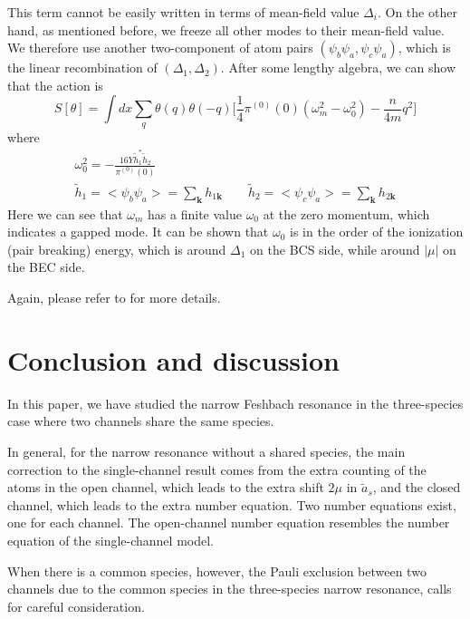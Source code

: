 \documentclass[reprint,pra]{revtex4-1}
\newcommand{\vk}{\ensuremath{\mathbf{k}}}
\newcommand{\nth}[1]{\ensuremath{\frac{1}{#1}}}
\providecommand{\abs}[1]{\ensuremath{\left\lvert{#1}\right\rvert}}
\newcommand{\av}[1]{\ensuremath{\bigl<{#1}\bigr>}}
\begin{document}
This term cannot be easily written in terms of mean-field value $\Delta_i$.   On the other hand, as mentioned before, we freeze all  other modes to their mean-field value.  We therefore use another two-component of atom pairs $({\psi_{b}\psi_{a}},{\psi_{c}\psi_{a}})$, which is the linear recombination of $(\Delta_{1},\Delta_{2})$.  
   After some lengthy algebra, we can show that the action is 
\begin{equation}\label{eq:pathInt2:outofphase}
S[\theta]=\int{dx}\sum_{q}\theta(q)\theta(-q)\big[\nth{4}\pi^{(0)}(0)(\omega_m^2-\omega_{0}^{2})-\frac{n}{4m}q^2\big]
\end{equation}
where
\begin{gather*}
\omega_{0}^{2}=-\frac{16Y\tilde{h}_{1}^{*}\tilde{h}_{2}}{\pi^{(0)}(0)}\\
 \tilde{h}_{1}=\av{\psi_{b}\psi_{a}}=\sum_{\vk}h_{1\vk}\qquad
\tilde{h}_{2}=\av{\psi_{c}\psi_{a}}=\sum_{\vk}h_{2\vk}
 \end{gather*}
Here we can see that  $\omega_{m}$ has a finite value $\omega_{0}$ at the zero momentum, which indicates a gapped mode. It can be shown that $\omega_{0}$
 is in the order of the ionization (pair breaking) energy, which is around $\Delta_1$ on the BCS side, while around $\abs{\mu}$ on the BEC side. 

Again, please refer to \cite{Zhuthesis} for more details. 
\section{Conclusion  and discussion\label{sec:conclusion}}
In this paper, we have studied the narrow Feshbach resonance in  the three-species case where two channels share the same species.  

In general, for the narrow resonance without a shared species, the main correction to the single-channel result comes from the  extra counting of the atoms in the open channel, which leads to the extra shift $2\mu$ in $\tilde{a}_{s}$, and the closed channel, which leads to the extra number equation.  Two number equations exist, one for each channel.  The open-channel number equation resembles the number equation of the single-channel model.

When there is a common species,  however, the  Pauli exclusion between two channels due to the common species in the three-species narrow resonance, calls for careful  consideration. 
\end{document}
